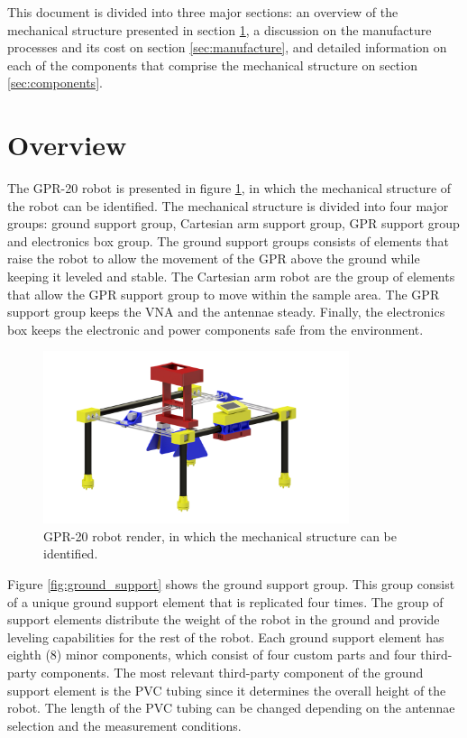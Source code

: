 \documentclass{article}
\begin{document}
This document is divided into three major sections: an overview of the mechanical structure presented in section \ref{sec:overview}, a discussion on the manufacture processes and its cost on section \ref{sec:manufacture}, and detailed information on each of the components that comprise the mechanical structure on section \ref{sec:components}.

\newpage
\section{Overview} \label{sec:overview}
The GPR-20 robot is presented in figure \ref{fig:robot}, in which the mechanical structure of the robot can be identified. The mechanical structure is divided into four major groups: ground support group, Cartesian arm support group, GPR support group and electronics box group. The ground support groups consists of elements that raise the robot to allow the movement of the GPR above the ground while keeping it leveled and stable. The Cartesian arm robot are the group of elements that allow the GPR support group to move within the sample area. The GPR support group keeps the VNA and the antennae steady. Finally, the electronics box keeps the electronic and power components safe from the environment.

\begin{figure}[h]
    \centering
    \includegraphics[width=0.8\textwidth]{images/groups/robot.png}
    \caption{GPR-20 robot render, in which the mechanical structure can be identified.}
    \label{fig:robot}
\end{figure}

Figure \ref{fig:ground_support} shows the ground support group. This group consist of a unique ground support element that is replicated four times. The group of support elements distribute the weight of the robot in the ground and provide leveling capabilities for the rest of the robot. Each ground support element has eighth (8) minor components, which consist of four custom parts and four third-party components. The most relevant third-party component of the ground support element is the PVC tubing since it determines the overall height of the robot. The length of the PVC tubing can be changed depending on the antennae selection and the measurement conditions.
\end{document}
